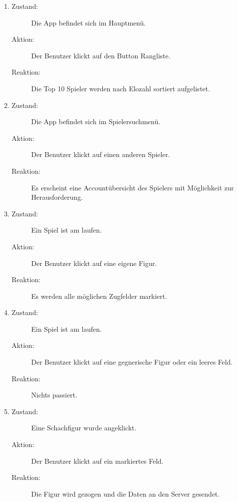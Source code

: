 \documentclass[parskip=full]{scrartcl}
\begin{document}
\begin{enumerate}
	\item
	\begin{description}
	\item[Zustand:] Die App befindet sich im Hauptmenü.
	\item[Aktion:] Der Benutzer klickt auf den Button \glqq Rangliste\grqq.
	\item[Reaktion:] Die Top 10 Spieler werden nach Elozahl sortiert aufgelistet.  \\
	\end{description}
	
	\item
	\begin{description}
	\item[Zustand:] Die App befindet sich im Spielersuchmenü.
	\item[Aktion:] Der Benutzer klickt auf einen anderen Spieler.
	\item[Reaktion:] Es erscheint eine Accountübersicht des Spielers mit Möglichkeit zur Herausforderung.  \\
	\end{description}
	
	\item 
	\begin{description}
	\item[Zustand:] Ein Spiel ist am laufen.
	\item[Aktion:] Der Benutzer klickt auf eine eigene Figur.
	\item[Reaktion:] Es werden alle möglichen Zugfelder markiert.  \\
	\end{description}
	
	\item 
	\begin{description}
	\item[Zustand:] Ein Spiel ist am laufen.
	\item[Aktion:] Der Benutzer klickt auf eine gegnerische Figur oder ein leeres Feld.
	\item[Reaktion:] Nichts passiert.  \\
	\end{description}
	
	
	\item
	\begin{description}
	\item[Zustand:] Eine \gls{Schachfigur} wurde angeklickt.
	\item[Aktion:] Der Benutzer klickt auf ein markiertes Feld.
	\item[Reaktion:] Die Figur wird gezogen und die Daten an den Server gesendet.  \\
	\end{description}
	

\end{enumerate}
\end{document}
